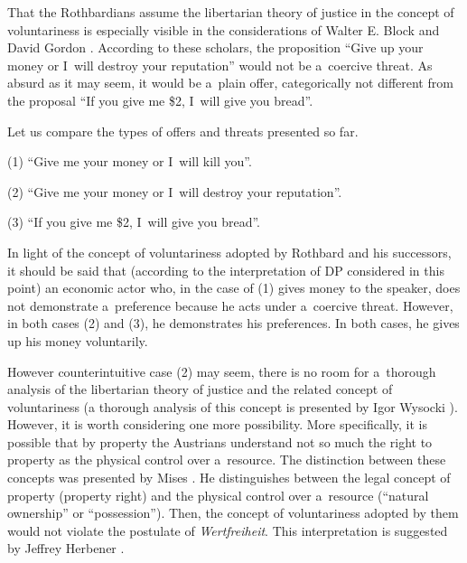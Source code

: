 That the Rothbardians assume the libertarian theory of justice in the concept of voluntariness is especially visible in the considerations of Walter E. Block and David Gordon 
\parencite*[][]{}. %
 According to these scholars, the proposition ``Give up your money or I~will destroy your reputation'' would not be a~coercive threat. As absurd as it may seem, it would be a~plain offer, categorically not different from the proposal ``If you give me \$2, I~will give you bread''.



Let us compare the types of offers and threats presented so far.



(1) ``Give me your money or I~will kill you''.



(2) ``Give me your money or I~will destroy your reputation''.



(3) ``If you give me \$2, I~will give you bread''.



In light of the concept of voluntariness adopted by Rothbard and his successors, it should be said that (according to the interpretation of DP considered in this point) an economic actor who, in the case of (1) gives money to the speaker, does not demonstrate a~preference because he acts under a~coercive threat. However, in both cases (2) and (3), he demonstrates his preferences. In both cases, he gives up his money voluntarily.



However counterintuitive case (2) may seem, there is no room for a~thorough analysis of the libertarian theory of justice and the related concept of voluntariness (a thorough analysis of this concept is presented by Igor Wysocki 
\parencite*[][]{wysocki_austro-libertarian_2021}%
). However, it is worth considering one more possibility. More specifically, it is possible that by property the Austrians understand not so much the right to property as the physical control over a~resource. The distinction between these concepts was presented by Mises 
\parencite*[][pp.37–39]{mises_socialism_1962}. %
 He distinguishes between the legal concept of property (property right) and the physical control over a~resource (``natural ownership'' or ``possession''). Then, the concept of voluntariness adopted by them would not violate the postulate of \textit{Wertfreiheit}. This interpretation is suggested by Jeffrey Herbener 
\parencite*[][p.99]{herbener_pareto_1997}.%




